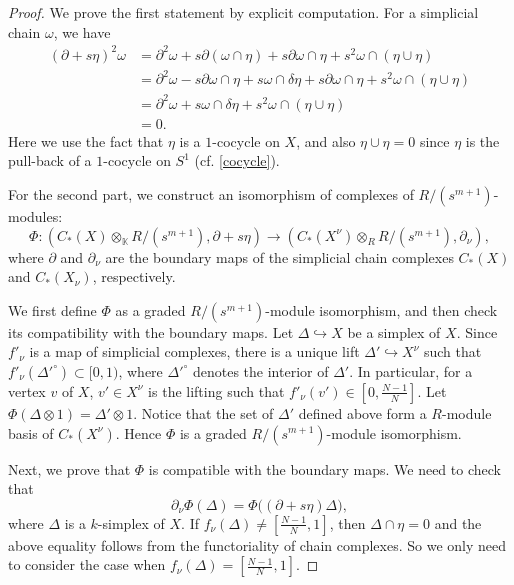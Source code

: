 \documentclass[12pt,leqno,twoside]{amsart}
\theoremstyle{plain}
\theoremstyle{definition}
\newcommand{\K}{\mathbb{K}}
\begin{document}
\begin{proof}
We prove the first statement by explicit computation. For a simplicial chain $\omega$, we have
\begin{align*}
(\partial+s \eta)^2\omega&=\partial^2\omega+s\partial(\omega\cap \eta)+s \partial\omega\cap \eta+s^2\omega\cap(\eta\cup\eta)\\
&=\partial^2\omega-s\partial\omega\cap\eta+s\omega\cap\delta\eta+s\partial\omega\cap\eta+s^2\omega\cap(\eta\cup\eta)\\
&=\partial^2\omega+s\omega\cap\delta\eta+s^2\omega\cap(\eta\cup\eta)\\
&=0.
\end{align*}
Here we use the fact that $\eta$ is a $1$-cocycle on $X$, and also $\eta \cup \eta=0$ since $\eta$ is the pull-back of a $1$-cocycle on $S^1$ (cf. \eqref{cocycle}).

For the second part, we construct an isomorphism of complexes of $R/(s^{m+1})$-modules:
\begin{equation}\label{eq3}
\Phi: \left(C_*(X)\otimes_{\K}R/(s^{m+1}), \partial+s\eta \right)\to \left(C_*(X^\nu)\otimes_{R} R/(s^{m+1}), \partial_\nu\right),
\end{equation}
where $\partial$ and $\partial_\nu$ are the boundary maps of the simplicial chain complexes $C_*(X)$ and $C_*(X_\nu)$, respectively.

We first define $\Phi$ as a graded $R/(s^{m+1})$-module isomorphism, and then check its compatibility with the boundary maps. Let $\Delta\hookrightarrow X$ be a simplex of $X$. Since $f'_\nu$ is a map of simplicial complexes, there is a unique lift $\Delta'\hookrightarrow X^\nu$ such that $f'_\nu(\Delta'^\circ)\subset [0, 1)$, where $\Delta'^\circ$ denotes the interior of $\Delta'$. 
In particular, for a vertex $v$ of $X$, $v'\in X^\nu$ is the lifting such that $f'_\nu(v')\in [0, \frac{N-1}{N}]$.
Let $\Phi(\Delta\otimes 1)=\Delta'\otimes 1$. Notice that the set of $\Delta'$ defined above form a $R$-module basis of $C_*(X^\nu)$. Hence $\Phi$ is a graded $R/(s^{m+1})$-module isomorphism. 

Next, we prove that $\Phi$ is compatible with the boundary maps. We need to check that
\[
\partial_\nu\Phi(\Delta)=\Phi\big((\partial+s\eta)\Delta\big),
\]
where $\Delta$ is a $k$-simplex of $X$. 
If $f_\nu(\Delta)\neq [\frac{N-1}{N}, 1]$, then $\Delta\cap \eta=0$ and the above equality follows from the functoriality of chain complexes. 
So we only need to consider the case when $f_\nu(\Delta)=[\frac{N-1}{N}, 1]$. 


\end{proof}
\end{document}
